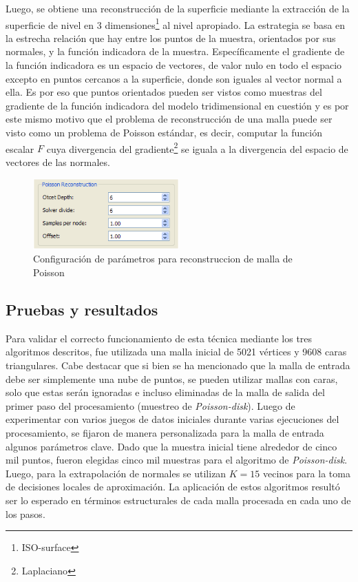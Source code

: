 Luego, se obtiene una reconstrucción de la superficie mediante la extracción de la superficie de nivel en 3 dimensiones\footnote{ISO-surface} al nivel apropiado.
La estrategia se basa en la estrecha relación que hay entre los puntos de la muestra, orientados por sus normales, y la función indicadora de la muestra. Específicamente el gradiente de la función indicadora es un espacio de vectores, de valor nulo en todo el espacio excepto en puntos cercanos a la superficie, donde son iguales al vector normal a ella.
Es por eso que puntos orientados pueden ser vistos como muestras del gradiente de la función indicadora del modelo tridimensional en cuestión y es por este mismo motivo que el problema de reconstrucción de una malla puede ser visto como un problema de Poisson estándar, es decir, computar la función escalar $F$ cuya divergencia del gradiente\footnote{Laplaciano} se iguala a la divergencia del espacio de vectores de las normales.

\begin{figure}[H]
  \centering
    \includegraphics[width=0.5\textwidth]{./Cap6_reconstruccion/malla-poissonreconstruction.png}
  \caption{Configuración de parámetros para reconstruccion de malla de Poisson}
  \label{fig:Mesh-Normals}
\end{figure}

\subsection{Pruebas y resultados}

Para validar el correcto funcionamiento de esta técnica mediante los tres algoritmos descritos, fue utilizada una malla inicial de 5021 vértices y 9608 caras triangulares. Cabe destacar que si bien se ha mencionado que la malla de entrada debe ser simplemente una nube de puntos, se pueden utilizar mallas con caras, solo que estas serán ignoradas e incluso eliminadas de la malla de salida del primer paso del procesamiento (muestreo de \emph{Poisson-disk}).
Luego de experimentar con varios juegos de datos iniciales durante varias ejecuciones del procesamiento, se fijaron de manera personalizada para la malla de entrada algunos parámetros clave. Dado que la muestra inicial tiene alrededor de cinco mil puntos, fueron elegidas cinco mil muestras para el algoritmo de \emph{Poisson-disk}. Luego, para la extrapolación de normales se utilizan $K=15$ vecinos para la toma de decisiones locales de aproximación.
La aplicación de estos algoritmos resultó ser lo esperado en términos estructurales de cada malla procesada en cada uno de los pasos.

